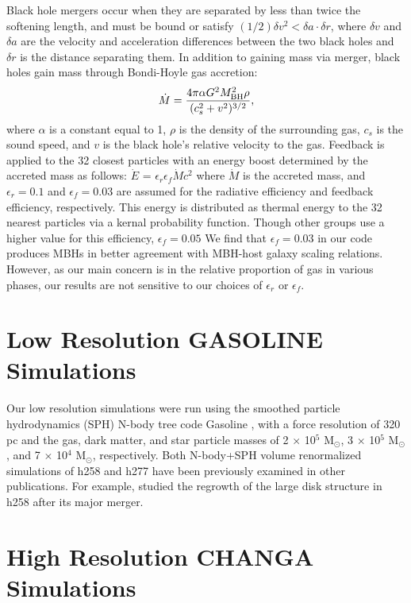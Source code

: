 \documentclass[12pt,headA,chapB]{fiskthesis}
\begin{document}
Black hole mergers occur when they are separated by less than twice the softening length, and must be bound or satisfy $(1/2) \delta v^2 < \delta a \cdot \delta r$,  where $\delta v$ and $\delta a$ are the velocity and acceleration differences between the two black holes and $\delta r$ is the distance separating them. In addition to gaining mass via merger, black holes gain mass through Bondi-Hoyle gas accretion:
\begin{equation}
\dot{M} = \frac{4 \pi \alpha G^2 M^{2}_{\rm BH} \rho}{(c^{2}_{s} + v^2)^{3/2}},
\end{equation}
where $\alpha$ is a constant equal to 1, $\rho$ is the density of the surrounding gas, $c_s$ is the sound speed, and $v$ is the black hole's relative velocity to the gas. Feedback is applied to the 32 closest particles with an energy boost determined by the accreted mass as follows: $\dot{E}$ = $\epsilon _{r}$$\epsilon_{f}$$\dot{M}$$c^2$ where $\dot{M}$ is the accreted mass, and $\epsilon _r = 0.1$ and $\epsilon _f = 0.03$ are assumed for the radiative efficiency and feedback efficiency, respectively. This energy is distributed as thermal energy to the 32 nearest particles via a kernal probability function. Though other groups use a higher value for this efficiency, $\epsilon _f = 0.05$ \citep{Sijacki2007,DiMatteo2008} We find that $\epsilon_f = 0.03$ in our code produces MBHs in better agreement with MBH-host galaxy scaling relations. However, as our main concern is in the relative proportion of gas in various phases, our results are not sensitive to our choices of $\epsilon _{r}$ or $\epsilon_{f}$.
 
\section{\normalsize Low Resolution GASOLINE Simulations}

Our low resolution simulations were run using the smoothed particle hydrodynamics (SPH) N-body tree code Gasoline \citep{Wadsley2004}, with a force resolution of 320 pc and the gas, dark matter, and star particle masses of 2 $\times$ 10$^5$ M$_{\odot}$, 3 $\times$ 10$^5$ M$_{\odot}$, and 7 $\times$ 10$^4$ M$_{\odot}$, respectively. Both N-body+SPH volume renormalized simulations of h258 and h277 have been previously examined in other publications. For example, \cite{Governato2009} studied the regrowth of the large disk structure in h258 after its major merger. 
	
\section{\normalsize High Resolution CHANGA Simulations}
\end{document}
